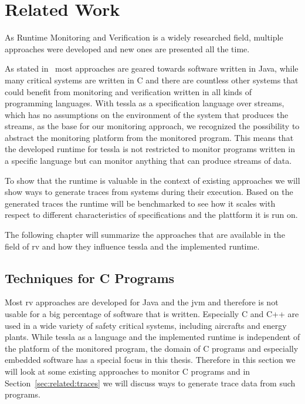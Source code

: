 %
\chapter{Related Work}
\label{sec:related}

As Runtime Monitoring and Verification is a widely researched field, multiple approaches were developed and new ones are presented all the time.

As stated in~\cite{Havelund2008} most approaches are geared towards software written in Java, while many critical systems are written in C and there are countless other systems that could benefit from monitoring and verification written in all kinds of programming languages.
With \gls{tessla} as a specification language over streams, which has no assumptions on the environment of the system that produces the streams,  as the base for our monitoring approach, we recognized the possibility to abstract the monitoring platform from the monitored program.
This means that the developed runtime for \gls{tessla} is not restricted to monitor programs written in a specific language but can monitor anything that can produce streams of data.

To show that the runtime is valuable in the context of existing approaches we will show ways to generate traces from systems during their execution.
Based on the generated traces the runtime will be benchmarked to see how it scales with respect to different characteristics of specifications and the plattform it is run on.

The following chapter will summarize the approaches that are available in the field of \gls{rv} and how they influence \gls{tessla} and the implemented runtime.

\section{ Techniques for C Programs}
\label{sec:related:c_programs}

Most \gls{rv} approaches are developed for Java and the \gls{jvm} and therefore is not usable for a big percentage of software that is written.
Especially C and C++ are used in a wide variety of safety critical systems, including aircrafts and energy plants.
While \gls{tessla} as a language and the implemented runtime is independent of the platform of the monitored program, the domain of C programs and especially embedded software has a special focus in this thesis.
Therefore in this section we will look at some existing approaches to monitor C programs and in Section~\ref{sec:related:traces} we will discuss ways to generate trace data from such programs.

